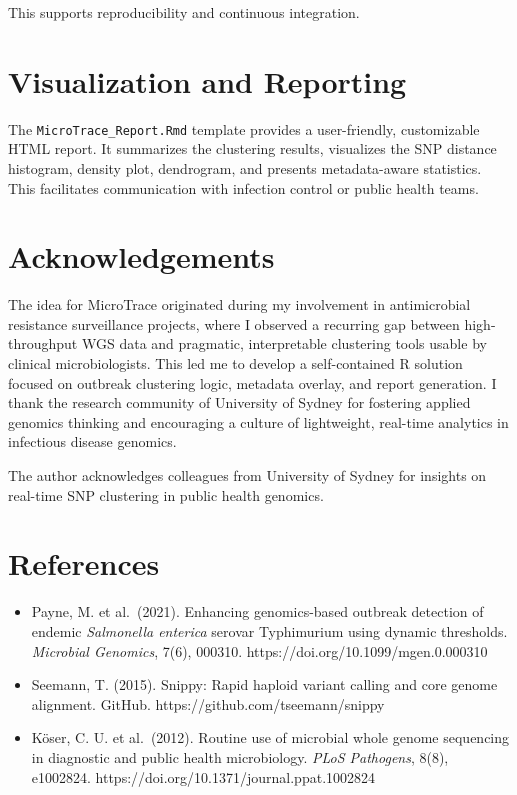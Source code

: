 This supports reproducibility and continuous integration.

\section{Visualization and Reporting}\label{visualization-and-reporting}

The \texttt{MicroTrace\_Report.Rmd} template provides a user-friendly,
customizable HTML report. It summarizes the clustering results,
visualizes the SNP distance histogram, density plot, dendrogram, and
presents metadata-aware statistics. This facilitates communication with
infection control or public health teams.

\section{Acknowledgements}\label{acknowledgements}

The idea for MicroTrace originated during my involvement in
antimicrobial resistance surveillance projects, where I observed a
recurring gap between high-throughput WGS data and pragmatic,
interpretable clustering tools usable by clinical microbiologists. This
led me to develop a self-contained R solution focused on outbreak
clustering logic, metadata overlay, and report generation. I thank the
research community of University of Sydney for fostering applied
genomics thinking and encouraging a culture of lightweight, real-time
analytics in infectious disease genomics.

The author acknowledges colleagues from University of Sydney for
insights on real-time SNP clustering in public health genomics.

\section{References}\label{references}

\begin{itemize}
\item
  Payne, M. et al.~(2021). Enhancing genomics-based outbreak detection
  of endemic \emph{Salmonella enterica} serovar Typhimurium using
  dynamic thresholds. \emph{Microbial Genomics}, 7(6), 000310.
  https://doi.org/10.1099/mgen.0.000310
\item
  Seemann, T. (2015). Snippy: Rapid haploid variant calling and core
  genome alignment. GitHub. https://github.com/tseemann/snippy
\item
  Köser, C. U. et al.~(2012). Routine use of microbial whole genome
  sequencing in diagnostic and public health microbiology. \emph{PLoS
  Pathogens}, 8(8), e1002824.
  https://doi.org/10.1371/journal.ppat.1002824
\end{itemize}
